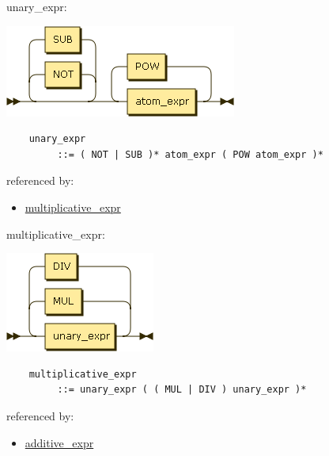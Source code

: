 \begin{minipage}{\textwidth}
    \protect\hypertarget{unary_expr}{}{unary\_expr:}

    \includegraphics[width=3.00000in,height=1.18750in]{diagram/unary_expr.png}

    \begin{verbatim}
    unary_expr
         ::= ( NOT | SUB )* atom_expr ( POW atom_expr )*
    \end{verbatim}

    referenced by:

    \begin{itemize}
            \tightlist
        \item
            \protect\hyperlink{multiplicative_expr}{multiplicative\_expr}
    \end{itemize}

\end{minipage}

\begin{minipage}{\textwidth}
    \protect\hypertarget{multiplicative_expr}{}{multiplicative\_expr:}

    \includegraphics[width=1.93750in,height=1.29167in]{diagram/multiplicative_expr.png}

    \begin{verbatim}
    multiplicative_expr
         ::= unary_expr ( ( MUL | DIV ) unary_expr )*
    \end{verbatim}

    referenced by:

    \begin{itemize}
            \tightlist
        \item
            \protect\hyperlink{additive_expr}{additive\_expr}
    \end{itemize}

\end{minipage}

